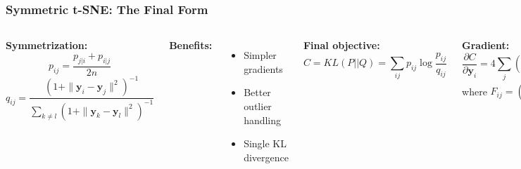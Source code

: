\documentclass[aspectratio=169]{beamer}
\begin{document}
\begin{frame}
\frametitle{Symmetric t-SNE: The Final Form}
\begin{columns}[T]
\textbf{Symmetrization:}
$$p_{ij} = \frac{p_{j|i} + p_{i|j}}{2n}$$
$$q_{ij} = \frac{(1+\|\mathbf{y}_i-\mathbf{y}_j\|^2)^{-1}}{\sum_{k \neq l}(1+\|\mathbf{y}_k-\mathbf{y}_l\|^2)^{-1}}$$

\vspace{0.3cm}
\textbf{Benefits:}
\begin{itemize}
\small
\item Simpler gradients
\item Better outlier handling  
\item Single KL divergence
\end{itemize}

\textbf{Final objective:}
$$C = KL(P||Q) = \sum_{ij} p_{ij} \log\frac{p_{ij}}{q_{ij}}$$

\vspace{0.3cm}
\textbf{Gradient:}
$$\frac{\partial C}{\partial \mathbf{y}_i} = 4\sum_j (p_{ij} - q_{ij})F_{ij}(\mathbf{y}_i - \mathbf{y}_j)$$
where $F_{ij} = (1 + \|\mathbf{y}_i - \mathbf{y}_j\|^2)^{-1}$

\vspace{0.2cm}
This is t-SNE!
\end{columns}
\end{frame}
\end{document}
